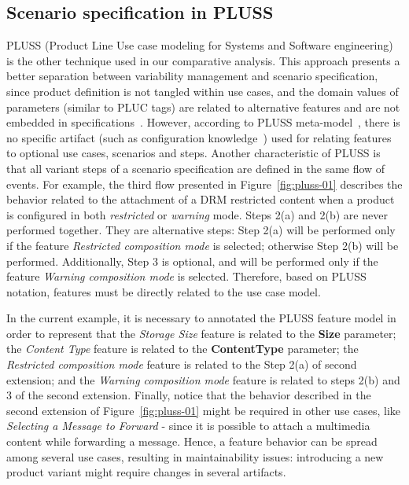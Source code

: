 \documentclass{acm_proc_article-sp}
\begin{document}
\subsection{Scenario specification in PLUSS}
\label{sub:pluss}

PLUSS (Product Line Use case modeling for Systems and Software engineering) is the other technique used in our comparative analysis. This approach presents a better separation 
between variability management and scenario specification, since product definition is not tangled within use cases, 
and the domain values of parameters (similar to PLUC tags) are related to alternative features and are 
not embedded in specifications~\cite{eriksson-splc-2005}. 
However, according to PLUSS meta-model~\cite{eriksson-splc-2005}, there is no specific artifact (such as configuration knowledge~\cite{czarnecki-book, phol-spl-book}) used for relating  features to optional use cases, scenarios and steps. 
Another characteristic of PLUSS is that all variant steps of a scenario specification are defined in the same flow of events. 
For example, the third flow presented in Figure~\ref{fig:pluss-01} describes the behavior related to the attachment of 
a DRM restricted content when a product is configured in both \emph{restricted} or \emph{warning} mode. Steps 2(a) and 2(b) are 
never performed together. They are alternative steps: Step 2(a) will be performed only if the feature \emph{Restricted composition 
mode} is selected; otherwise Step 2(b) will be performed. Additionally, Step 3 is optional, and will be performed only if the feature 
\emph{Warning composition mode} is selected. Therefore, based on PLUSS notation, features must be directly related to the use case 
model. 

In the current example, it is necessary to annotated the PLUSS feature model in order to represent that the 
\emph{Storage Size} feature is related to the {\bf Size} parameter; the \emph{Content Type} feature is related to the {\bf ContentType} parameter; the \emph{Restricted composition mode} feature is 
related to the Step 2(a) of second extension; and the \emph{Warning composition mode} feature is 
related to steps 2(b) and 3 of the second extension. Finally, notice that the behavior described in the second 
extension of Figure~\ref{fig:pluss-01} might be required in other use cases, like \emph{Selecting a Message to Forward} - 
since it is possible to attach a multimedia content while forwarding a message. Hence, a feature behavior can be spread 
among several use cases, resulting in maintainability issues: introducing a new product 
variant might require changes in several artifacts.
\end{document}
